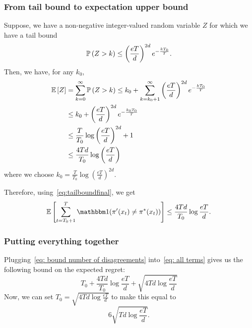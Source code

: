 \documentclass[11pt]{article}
\begin{document}
\subsubsection{From tail bound to expectation upper bound}

Suppose, we have a non-negative integer-valued random variable $Z$ for which we have a tail bound 
\[
\mathbb{P}\left( Z > k \right) \le \left(\frac{eT}{d}\right)^{2d} e^{-\frac{kT_0}{T}} .
\]
Then, we have, for any $k_0$,
\begin{align*}
\mathbb{E}\left[ Z \right] &= \sum_{k=0}^\infty \mathbb{P}\left( Z > k \right) \le k_0 + \sum_{k=k_0+1}^\infty \left(\frac{eT}{d}\right)^{2d} e^{-\frac{kT_0}{T}} \\
&\le k_0 +  \left(\frac{eT}{d}\right)^{2d} e^{-\frac{k_0 T_0}{T}} \\
&\le \frac{T}{T_0} \log \left(\frac{eT}{d}\right)^{2d} + 1 \\
& \le \frac{4Td}{T_0} \log \left(\frac{eT}{d}\right)
\end{align*}
where we choose $k_0 = \frac{T}{T_0} \log \left(\frac{eT}{d}\right)^{2d}$.

Therefore, using~\eqref{eq:tailboundfinal}, we get
\begin{equation}\label{eq: bound number of disagreements}
\E{\sum_{t=T_0+1}^T\ind(\pi'(x_t)\neq \pi^*(x_t))} \le \frac{4Td}{T_0}\log{\frac{eT}{d}} .
\end{equation}

\subsubsection{Putting everything together}

Plugging~\eqref{eq: bound number of disagreements} into~\eqref{eq: all terms} gives us the following bound on the expected regret:
\[
T_0 + \frac{4Td}{T_0}\log{\frac{eT}{d}} + \sqrt{ 4Td \log{\frac{eT}{d}} }
\]
Now, we can set $T_0 = \sqrt{4Td \log{\frac{eT}{d}} }$ to make this equal to
\[
6 \sqrt{Td \log{\frac{eT}{d}} } .
\]


\end{document}
